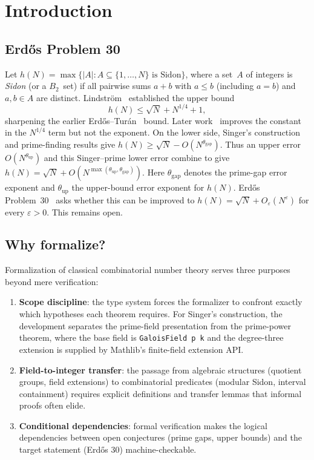 \documentclass[11pt,a4paper]{article}
\begin{document}
\section{Introduction}
\label{sec:intro}

\subsection{Erd\H{o}s Problem 30}

Let $h(N) = \max\{|A| : A \subseteq \{1,\dots,N\} \text{ is Sidon}\}$, where a
set~$A$ of integers is \emph{Sidon} (or a $B_2$~set) if all pairwise sums
$a + b$ with $a \le b$ (including $a=b$) and $a, b \in A$ are distinct.
Lindstr\"om~\cite{Lindstrom1969}
established the upper bound
\[
  h(N) \le \sqrt{N} + N^{1/4} + 1,
\]
sharpening the earlier Erd\H{o}s--Tur\'an~\cite{ET1941} bound.  Later
work~\cite{BaloghFurediRoy2023,CarterHunterOBryant2025} improves the constant
in the \(N^{1/4}\) term but not the exponent.  On the lower side, Singer's
construction and prime-finding results give
\(h(N)\ge \sqrt N-O(N^{\theta_{\mathrm{gap}}})\).  Thus an upper error
\(O(N^{\theta_{\mathrm{up}}})\) and this Singer--prime lower error combine to
give \(h(N)=\sqrt N+O(N^{\max(\theta_{\mathrm{up}},\theta_{\mathrm{gap}})})\).
Here \(\theta_{\mathrm{gap}}\) denotes the prime-gap error exponent and
\(\theta_{\mathrm{up}}\) the upper-bound error exponent for \(h(N)\).
Erd\H{o}s Problem~30~\cite{Erdos1957,Guy2004} asks whether this can be improved to
$h(N) = \sqrt{N} + O_\varepsilon(N^\varepsilon)$
for every $\varepsilon > 0$.  This remains open.

\subsection{Why formalize?}

Formalization of classical combinatorial number theory serves three purposes
beyond mere verification:
\begin{enumerate}[nosep]
  \item \textbf{Scope discipline}: the type system forces the formalizer to
    confront exactly which hypotheses each theorem requires.  For Singer's
    construction, the development separates the prime-field presentation from
    the prime-power theorem, where the base field is \texttt{GaloisField p k}
    and the degree-three extension is supplied by Mathlib's finite-field
    extension API.
  \item \textbf{Field-to-integer transfer}: the passage from algebraic structures
    (quotient groups, field extensions) to combinatorial predicates (modular
    Sidon, interval containment) requires explicit definitions and transfer
    lemmas that informal proofs often elide.
  \item \textbf{Conditional dependencies}: formal verification makes the logical
    dependencies between open conjectures (prime gaps, upper bounds) and the
    target statement (Erd\H{o}s 30) machine-checkable.
\end{enumerate}
\end{document}
